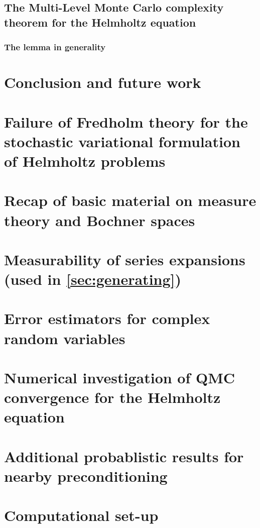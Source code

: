 \documentclass{report}
\begin{document}
\section{The Multi-Level Monte Carlo complexity theorem for the Helmholtz equation}\label{sec:comp}



\subsection{The lemma in generality}



\chapter{Conclusion and future work}\label{sec:future}


\appendix


\chapter{Failure of Fredholm theory for the stochastic variational formulation of Helmholtz problems}\label{sec:federico}
 	

\chapter{Recap of basic material on measure theory and Bochner spaces}\label{app:mtBs}


\chapter{Measurability of series expansions (used in \cref{sec:generating})}\label{app:meas}


\chapter{Error estimators for complex random variables}\label{app:complexerror}


\chapter{Numerical investigation of QMC convergence for the Helmholtz equation}\label{app:hhqmcconv}


\chapter{Additional probablistic results for nearby preconditioning}\label{app:probnbpc}


\chapter{Computational set-up}\label{app:compsetup}




\end{document}
